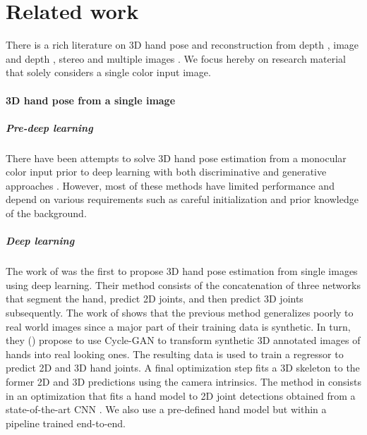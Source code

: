 \documentclass[10pt,twocolumn,letterpaper]{article}
\begin{document}
\section{Related work}

There is a rich literature on 3D hand pose and reconstruction from depth 
\cite{Wu_2018_ECCV,Zhou_2018_ECCV,Ge_2018_CVPR,Poier2018cvpr_preview,Wan_2018_CVPR,ge2016robust,
sharp2015accurate,sinha2016deephand,
keskin2012hand,khamis2015learning,li20153d,oberweger2015training,qian2014realtime,
sridhar2015fast,sun2015cascaded,tang2015opening,tompson2014real,xu2013efficient}, 
image and depth \cite{makris2015model,oikonomidis2011efficient,RealtimeHO_ECCV2016,OccludedHands_ICCV2017}, 
stereo
\cite{panteleris2017back,zhang20163d,rosales20013d} 
and multiple images 
\cite{de2006regression,oikonomidis2010markerless,ellipsoidtracker_3dv2014}. We focus hereby on research material that solely considers a single color input image.    
 
\paragraph{3D hand pose from a single image}
\vspace{-10pt}

\subparagraph{Pre-deep learning}
\vspace{-10pt}
There have been attempts to solve 3D hand pose estimation from a monocular color input prior to deep learning with both discriminative and generative approaches  \cite{1211500,de2011model,stenger2001model,thayananthan2003shape,wu2001capturing,5509753}. However, most of these methods have limited performance and depend on various requirements such as careful initialization and prior knowledge of the background.  
  
\subparagraph{Deep learning}
\vspace{-10pt}
The work of \cite{zimmermann2017learning} was the first to propose 3D hand pose estimation from single images using deep learning. Their method consists of the concatenation of three networks that segment the hand, predict 2D joints, and then predict 3D joints subsequently. The work of \cite{GANeratedHands_CVPR2018} shows that the previous method generalizes poorly to real world images since a major part of their training data is synthetic. In turn, they (\cite{GANeratedHands_CVPR2018}) propose to use Cycle-GAN \cite{zhu2017unpaired} to transform synthetic 3D annotated images of hands into real looking ones. The resulting data is used to train a regressor to predict 2D and 3D hand joints. A final optimization step fits a 3D skeleton to the former 2D and 3D predictions using the camera intrinsics. 
The method in \cite{panteleris2018using} consists in an optimization that fits a hand model to 2D joint detections obtained from a state-of-the-art CNN \cite{simon2017hand}. We also use a pre-defined hand model \cite{romero2017embodied} but within a pipeline trained end-to-end. 
\end{document}
